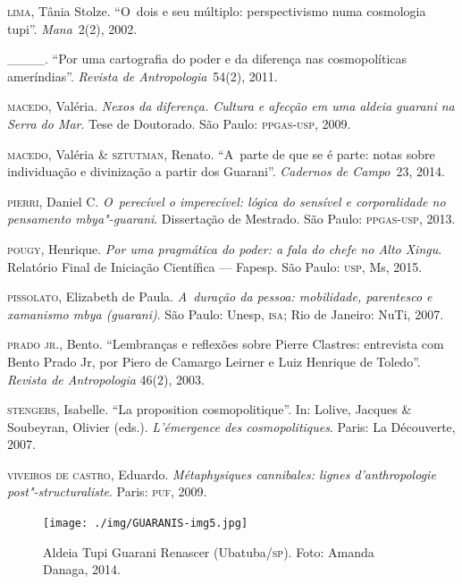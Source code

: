 \begin{Parskip}
\textsc{lima}, Tânia Stolze. ``O~dois e seu múltiplo: perspectivismo numa
cosmologia tupi''. \emph{Mana}~2(2), 2002.

\_\_\_\_. ``Por uma cartografia do poder e da diferença nas cosmopolíticas
ameríndias''. \emph{Revista de Antropologia}~54(2), 2011. 

\textsc{macedo}, Valéria. \emph{Nexos da diferença. Cultura e afecção em uma aldeia
guarani na Serra do Mar}. Tese de Doutorado. São Paulo: \textsc{ppgas}-\textsc{usp}, 2009.

\textsc{macedo}, Valéria \& \textsc{sztutman}, Renato. ``A~parte de que se é parte: notas
sobre individuação e divinização a partir dos Guarani''. \emph{Cadernos de
Campo}~23, 2014.

\textsc{pierri}, Daniel C. \emph{O~perecível o imperecível: lógica do sensível e
corporalidade no pensamento mbya"-guarani}. Dissertação de Mestrado. São
Paulo: \textsc{ppgas}-\textsc{usp}, 2013.

\textsc{pougy}, Henrique. \emph{Por uma pragmática do poder: a fala do chefe no Alto
Xingu}. Relatório Final de Iniciação Científica --- Fapesp. São Paulo:
\textsc{usp}, Ms, 2015. 

\textsc{pissolato}, Elizabeth de Paula. \emph{A~duração da pessoa: mobilidade,
parentesco e xamanismo mbya (guarani)}. São Paulo: Unesp, \textsc{isa}; Rio de
Janeiro: NuTi, 2007.

\textsc{prado} \textsc{jr}., Bento. ``Lembranças e reflexões sobre Pierre Clastres:
entrevista com Bento Prado Jr, por Piero de Camargo Leirner e Luiz
Henrique de Toledo''. \emph{Revista de Antropologia} 46(2), 2003.

\textsc{stengers}, Isabelle. ``La proposition cosmopolitique''. In: Lolive, Jacques
\& Soubeyran, Olivier (eds.). \emph{L’émergence des cosmopolitiques}. Paris:
La Découverte, 2007.

\textsc{viveiros} \textsc{de} \textsc{castro}, Eduardo. \emph{Métaphysiques cannibales: lignes
d’anthropologie post"-structuraliste}. Paris: \textsc{puf}, 2009.
\end{Parskip}

\clearpage
\thispagestyle{empty}

\movetoevenpage
\begin{absolutelynopagebreak}
\begin{vplace}
\begin{figure}[H]
\begin{adjustwidth}{-2.7cm}{}
 \vspace{-3.1cm}
 \texttt{[image: ./img/GUARANIS-img5.jpg]}	
  \hfill
  \end{adjustwidth}
  \caption{Aldeia Tupi Guarani Renascer (Ubatuba/\textsc{sp}). Foto: Amanda Danaga, 2014.}
\end{figure}
\end{vplace}

\thispagestyle{empty}
\end{absolutelynopagebreak}

